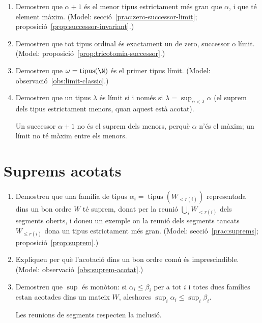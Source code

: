 \begin{enumerate}[resume]
  \item Demostreu que \(\alpha+1\) és el menor tipus estrictament més gran que \(\alpha\), i que té element màxim. (Model: secció~\ref{prac:zero-successor-limit}; proposició~\ref{prop:successor-invariant}.)

  \item Demostreu que tot tipus ordinal és exactament un de zero, successor o límit. (Model: proposició~\ref{prop:tricotomia-successor}.)

  \item Demostreu que \(\omega=\operatorname{tipus}(\N)\) és el primer tipus límit. (Model: observació~\ref{obs:limit-classic}.)

  \item Demostreu que un tipus \(\lambda\) és límit si i només si \(\lambda=\sup_{\alpha<\lambda}\alpha\) (el suprem dels tipus estrictament menors, quan aquest està acotat). \begin{indicacio}Un successor \(\alpha+1\) no és el suprem dels menors, perquè \(\alpha\) n'és el màxim; un límit no té màxim entre els menors.\end{indicacio}
\end{enumerate}

\section{Suprems acotats}

\begin{enumerate}[resume]
  \item Demostreu que una família de tipus \(\alpha_i=\operatorname{tipus}(W_{<r(i)})\) representada dins un bon ordre \(W\) té suprem, donat per la reunió \(\bigcup_iW_{<r(i)}\) dels segments oberts, i doneu un exemple on la reunió dels segments tancats \(W_{\le r(i)}\) dona un tipus estrictament més gran. (Model: secció~\ref{prac:suprems}; proposició~\ref{prop:suprem}.)

  \item Expliqueu per què l'acotació dins un bon ordre comú és imprescindible. (Model: observació~\ref{obs:suprem-acotat}.)

  \item Demostreu que \(\sup\) és monòton: si \(\alpha_i\le\beta_i\) per a tot \(i\) i totes dues famílies estan acotades dins un mateix \(W\), aleshores \(\sup_i\alpha_i\le\sup_i\beta_i\). \begin{indicacio}Les reunions de segments respecten la inclusió.\end{indicacio}
\end{enumerate}

